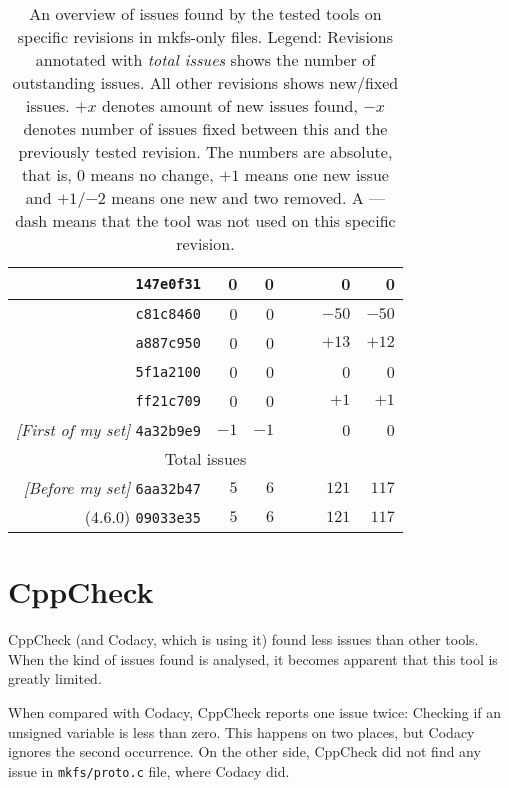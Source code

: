 \begin{table}[h]
\begin{tabular}{|r||r|r|r|r|r|r|}
\hline
{\tt 147e0f31} & 0 & 0 & & & 0 & 0 \\
\hline
{\tt c81c8460} & 0 & 0 & & & $-50$ & $-50$ \\
\hline
{\tt a887c950} & 0 & 0 & & & $+13$ & $+12$ \\
\hline
{\tt 5f1a2100} & 0 & 0 & & & 0 & 0 \\
\hline
{\tt ff21c709} & 0 & 0 & & & $+1$ & $+1$ \\
\hline
{\em [First of my set]} {\tt 4a32b9e9} & $-1$ & $-1$ & & & 0 & 0 \\
\hline
\hline
\multicolumn{7}{|c|}{Total issues} \\
\hline
{\em [Before my set]} {\tt 6aa32b47} & $5$ & $6$ & & & $121$ & $117$ \\
\hline
(4.6.0) {\tt 09033e35} & $5$ & $6$ & & & $121$ & $117$ \\
\hline
\end{tabular}
\caption{An overview of issues found by the tested tools on specific
	revisions in mkfs-only files.\newline
	\newline
	Legend: Revisions annotated with {\em total issues} shows the
	number of outstanding issues. All other revisions shows new/fixed
	issues.  $+x$ denotes amount of new issues found, $-x$ denotes number
	of issues fixed between this and the previously tested revision. The
	numbers are absolute, that is, 0 means no change, $+1$ means one new
	issue and $+1$/$-2$ means one new and two removed. A --- dash means that
	the tool was not used on this specific revision.}


\label{tab:results:overview}
\end{table}

\section{CppCheck}\label{chap:results:cppcheck}
CppCheck (and Codacy, which is using it) found less issues than other
tools. When the kind of issues found is analysed, it becomes apparent that
this tool is greatly limited.

When compared with Codacy, CppCheck reports one issue twice: Checking if an
unsigned variable is less than zero. This happens on two places, but Codacy
ignores the second occurrence. On the other side, CppCheck did not find any
issue in {\tt mkfs/proto.c} file, where Codacy did.

